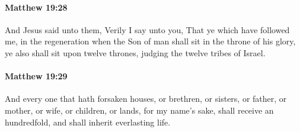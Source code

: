 		\paragraph{Matthew 19:28} %
			\label{MATTHEW-19-28}

			And Jesus said unto them, Verily I say unto you, That ye which have followed me, in the regeneration when the Son of man shall sit in the throne of his glory, ye also shall sit upon twelve thrones, judging the twelve tribes of Israel.

			\begin{framed}
			\scriptsize
				\begin{compactdesc}
					\item[SBLG] 
				\end{compactdesc}
			\end{framed}

		\paragraph{Matthew 19:29} %
			\label{MATTHEW-19-29}

			And every one that hath forsaken houses, or brethren, or sisters, or father, or mother, or wife, or children, or lands, for my name's sake, shall receive an hundredfold, and shall inherit everlasting life.

